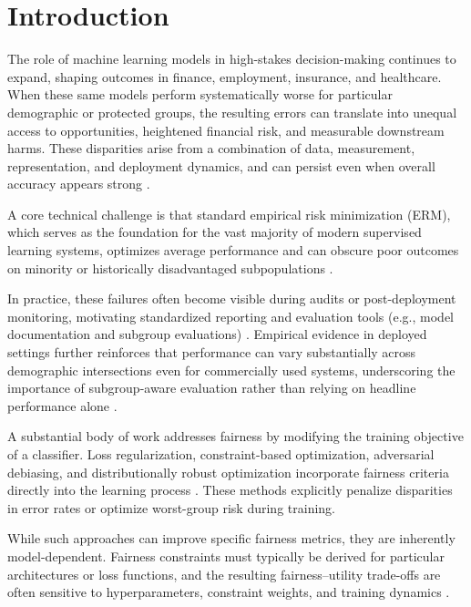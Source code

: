 
\section{Introduction}

The role of machine learning models in high-stakes decision-making continues to
expand, shaping outcomes in finance, employment, insurance, and healthcare.
When these same models perform systematically worse for particular demographic
or protected groups, the resulting errors can translate into unequal access to
opportunities, heightened financial risk, and measurable downstream harms.
These disparities arise from a combination of data, measurement, representation,
and deployment dynamics, and can persist even when overall accuracy appears
strong \cite{SureshGuttag2021SourcesOfHarm}.

A core technical challenge is that standard empirical risk minimization (ERM),
which serves as the foundation for the vast majority of modern supervised
learning systems, optimizes average performance and can obscure poor outcomes
on minority or historically disadvantaged subpopulations
\cite{Mehrabi2021SurveyBiasFairness}.

In practice, these failures often become visible during audits or
post-deployment monitoring, motivating standardized reporting and evaluation
tools (e.g., model documentation and subgroup evaluations)
\cite{Mitchell2019ModelCards,Gebru2018Datasheets}.
Empirical evidence in deployed settings further reinforces that performance can
vary substantially across demographic intersections even for commercially used
systems, underscoring the importance of subgroup-aware evaluation rather than
relying on headline performance alone \cite{BuolamwiniGebru2018GenderShades}.

A substantial body of work addresses fairness by modifying the training
objective of a classifier.
Loss regularization, constraint-based optimization, adversarial debiasing, and
distributionally robust optimization incorporate fairness criteria directly into
the learning process \cite{sagawa2020distributionally}.
These methods explicitly penalize disparities in error rates or optimize
worst-group risk during training.

While such approaches can improve specific fairness metrics, they are
inherently model-dependent.
Fairness constraints must typically be derived for particular architectures or
loss functions, and the resulting fairness--utility trade-offs are often
sensitive to hyperparameters, constraint weights, and training dynamics
\cite{Mehrabi2021SurveyBiasFairness}.


